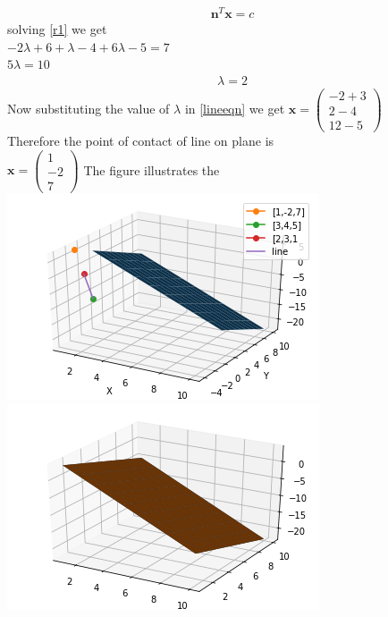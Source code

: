 \documentclass[10pt,a4paper,twocolumn]{article}
\numberwithin{equation}{section}
\begin{document}
\begin{gather}\label{r1}
\textbf{n}^T\textbf{x}=c
\end{gather}
solving \ref{r1} we get \\
$ -2\lambda + 6+ \lambda -4 + 6 \lambda-5=7$ \\ $ 5 \lambda=10 $
\begin{gather}\label{la} 
\lambda=2 
\end{gather}
Now substituting the value of $\lambda$ in \ref{lineeqn} we get 
$\textbf{x}=\begin{pmatrix}-2+3\\2-4\\12-5 \end{pmatrix}$
\\Therefore the point of contact of line on plane is
\\$\textbf{x}=\begin{pmatrix}1\\-2\\7 \end{pmatrix}$
\pagebreak
The figure illustrates the
\includegraphics{Figure_3}
\includegraphics{Figure_4}






\end{document}
